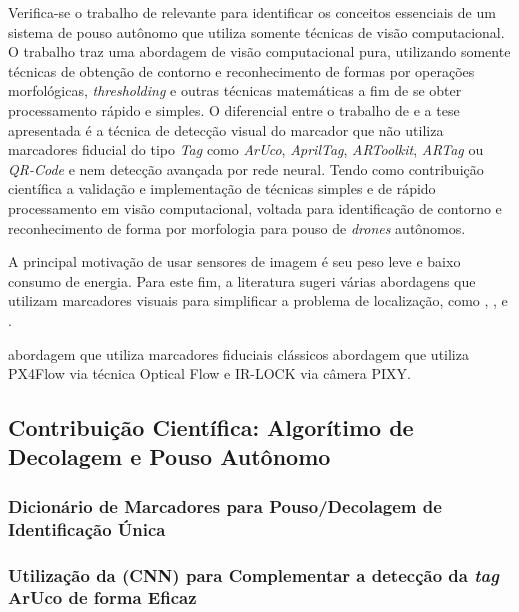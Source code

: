     Verifica-se o trabalho de \citet{Vidal2016} relevante para identificar os conceitos essenciais de um sistema de pouso autônomo que utiliza somente técnicas de visão computacional. O trabalho traz uma abordagem de visão computacional pura, utilizando somente técnicas de obtenção de contorno e reconhecimento de formas por operações morfológicas, \textit{thresholding} e outras técnicas matemáticas a fim de se obter processamento rápido e simples. O diferencial entre o trabalho de \citet{Vidal2016} e a tese apresentada é a técnica de detecção visual do marcador que não utiliza marcadores fiducial do tipo \textit{Tag} como \textit{ArUco}, \textit{AprilTag}, \textit{ARToolkit}, \textit{ARTag} ou \textit{QR-Code} e nem detecção avançada por rede neural. Tendo como contribuição científica a validação e implementação de técnicas simples e de rápido processamento em visão computacional, voltada para identificação de contorno e reconhecimento de forma por morfologia para pouso de \textit{drones} autônomos. 

    A principal motivação de usar sensores de imagem é seu peso leve e baixo consumo de energia. Para este fim, a literatura sugeri várias abordagens que utilizam marcadores visuais para simplificar a problema de localização, como \cite{Jayatilleke2013}, \cite{Faigl2013}, \cite{Pestana2016} e \cite{Salinas2013}.
    
       abordagem que utiliza marcadores fiduciais clássicos
    abordagem que utiliza PX4Flow via técnica Optical Flow e IR-LOCK via câmera PIXY. 
    


\subsection{Contribuição Científica: Algorítimo de Decolagem e Pouso Autônomo}

	\subsubsection{Dicionário de Marcadores para Pouso/Decolagem de Identificação Única}

	\subsubsection{Utilização da (CNN) para Complementar a detecção da \textit{tag} ArUco de forma Eficaz}

